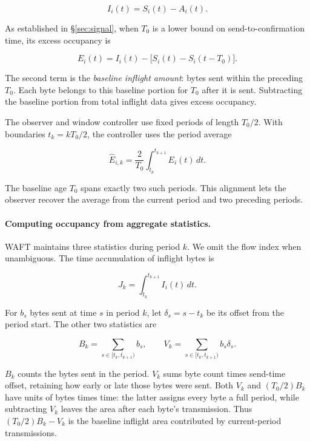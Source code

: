 \[
I_i(t)=S_i(t)-A_i(t).
\]

As established in \S\ref{sec:signal}, when \(T_0\) is a lower bound on send-to-confirmation time, its excess occupancy is

\begin{equation}
\label{eq:design-9}
E_i(t)=I_i(t)-\big[S_i(t)-S_i(t-T_0)\big].
\end{equation}

The second term is the \emph{baseline inflight amount}: bytes sent within the preceding \(T_0\). Each byte belongs to this baseline portion for \(T_0\) after it is sent. Subtracting the baseline portion from total inflight data gives excess occupancy.

The observer and window controller use fixed periods of length \(T_0/2\). With boundaries \(t_k=kT_0/2\), the controller uses the period average

\begin{equation}
\label{eq:design-10}
\widehat E_{i,k}
=
\frac{2}{T_0}\int_{t_k}^{t_{k+1}}E_i(t)\,dt.
\end{equation}

The baseline age \(T_0\) spans exactly two such periods. This alignment lets the observer recover the average from the current period and two preceding periods.

\paragraph{Computing occupancy from aggregate statistics.}

WAFT maintains three statistics during period \(k\). We omit the flow index when unambiguous. The time accumulation of inflight bytes is

\begin{equation}
\label{eq:design-11}
J_k=\int_{t_k}^{t_{k+1}}I_i(t)\,dt.
\end{equation}

For \(b_s\) bytes sent at time \(s\) in period \(k\), let \(\delta_s=s-t_k\) be its offset from the period start. The other two statistics are

\begin{equation}
\label{eq:design-12}
B_k=\sum_{s\in[t_k,t_{k+1})}b_s,
\qquad
V_k=\sum_{s\in[t_k,t_{k+1})}b_s\delta_s.
\end{equation}

\(B_k\) counts the bytes sent in the period. \(V_k\) sums byte count times send-time offset, retaining how early or late those bytes were sent. Both \(V_k\) and \((T_0/2)B_k\) have units of bytes times time: the latter assigns every byte a full period, while subtracting \(V_k\) leaves the area after each byte's transmission. Thus \((T_0/2)B_k-V_k\) is the baseline inflight area contributed by current-period transmissions.

